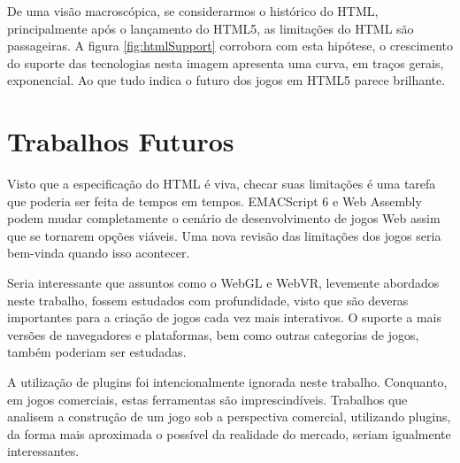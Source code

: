 De uma visão macroscópica, se considerarmos o histórico do HTML,
principalmente após o lançamento do HTML5, as limitações do HTML
são passageiras. A figura \ref{fig:htmlSupport} corrobora com esta
hipótese, o crescimento do suporte das tecnologias nesta imagem
apresenta uma curva, em traços gerais, exponencial. Ao que tudo indica
o futuro dos jogos em HTML5 parece brilhante.

\section{Trabalhos Futuros}

Visto que a especificação do HTML é viva, checar suas limitações
é uma tarefa que poderia ser feita de tempos em tempos. EMACScript 6
e Web Assembly podem mudar completamente o cenário de desenvolvimento
de jogos Web assim que se tornarem opções viáveis. Uma nova revisão 
das limitações dos jogos seria bem-vinda quando isso acontecer.

Seria interessante que assuntos como o WebGL e WebVR, levemente
abordados neste trabalho, fossem estudados com profundidade, visto
que são deveras importantes para a criação de jogos cada vez mais
interativos. O suporte a mais versões de navegadores e plataformas, bem
como outras categorias de jogos, também poderiam ser estudadas.

A utilização de plugins foi intencionalmente ignorada neste
trabalho. Conquanto, em jogos comerciais, estas ferramentas são
imprescindíveis. Trabalhos que analisem a construção de um jogo sob
a perspectiva comercial, utilizando plugins, da forma mais aproximada
o possível da realidade do mercado, seriam igualmente interessantes.
